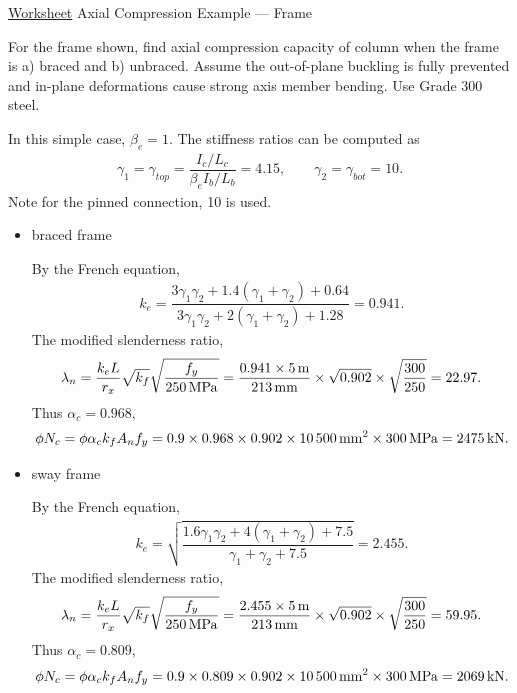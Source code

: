 \begin{exmp}\href{run:./WORKSHEET/CH04/EX4.ACFM.sm}{Worksheet}
Axial Compression Example --- Frame

For the frame shown, find axial compression capacity of column when the frame is a) braced and b) unbraced.
Assume the out-of-plane buckling is fully prevented and in-plane deformations cause strong axis member bending.
Use Grade 300 steel.
\begin{figure}[H]

\end{figure}
\end{exmp}
\begin{solution}
In this simple case, $\beta_e=1$.
The stiffness ratios can be computed as
\begin{gather*}
\gamma_1=\gamma_{top}=\dfrac{I_c/L_c}{\beta_eI_b/L_b}=4.15,\qquad
\gamma_2=\gamma_{bot}=10.
\end{gather*}
Note for the pinned connection, \num{10} is used.
\begin{itemize}
\item braced frame

By the French equation,
\begin{gather*}
k_e=\dfrac{3\gamma_1\gamma_2+1.4\left(\gamma_1+\gamma_2\right)+0.64}{3\gamma_1\gamma_2+2\left(\gamma_1+\gamma_2\right)+1.28}=0.941.
\end{gather*}
The modified slenderness ratio,
\begin{gather*}
\lambda_n=\dfrac{k_eL}{r_x}\sqrt{k_f}\sqrt{\dfrac{f_y}{\SI{250}{\mega\pascal}}}=\dfrac{0.941\times\SI{5}{\meter}}{\SI{213}{\milli\meter}}\times\sqrt{0.902}\times\sqrt{\dfrac{300}{250}}=22.97.
\end{gather*}
Thus $\alpha_c=0.968$,
\begin{gather*}
\phi{}N_c=\phi\alpha_ck_fA_nf_y=0.9\times0.968\times0.902\times\SI{10500}{\milli\meter^2}\times\SI{300}{\mega\pascal}=\SI{2475}{\kilo\newton}.
\end{gather*}
\item sway frame

By the French equation,
\begin{gather*}
k_e=\sqrt{\dfrac{1.6\gamma_1\gamma_2+4\left(\gamma_1+\gamma_2\right)+7.5}{\gamma_1+\gamma_2+7.5}}=2.455.
\end{gather*}
The modified slenderness ratio,
\begin{gather*}
\lambda_n=\dfrac{k_eL}{r_x}\sqrt{k_f}\sqrt{\dfrac{f_y}{\SI{250}{\mega\pascal}}}=\dfrac{2.455\times\SI{5}{\meter}}{\SI{213}{\milli\meter}}\times\sqrt{0.902}\times\sqrt{\dfrac{300}{250}}=59.95.
\end{gather*}
Thus $\alpha_c=0.809$,
\begin{gather*}
\phi{}N_c=\phi\alpha_ck_fA_nf_y=0.9\times0.809\times0.902\times\SI{10500}{\milli\meter^2}\times\SI{300}{\mega\pascal}=\SI{2069}{\kilo\newton}.
\end{gather*}
\end{itemize}
\end{solution}

